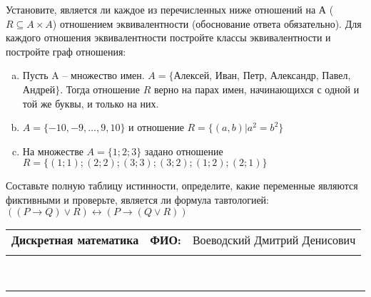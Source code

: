 \documentclass[10pt]{exam}
\newcommand{\class}{Дискретная математика}
\newcommand{\examdate}{}
\begin{document}
\begin{questions}
\question
Установите, является ли каждое из перечисленных ниже отношений на А ($R \subseteq A \times A$) отношением эквивалентности (обоснование ответа обязательно). Для каждого отношения эквивалентности постройте классы 
эквивалентности и постройте граф отношения:
\begin{enumerate} [a)]\setcounter{enumi}{0}
\item Пусть A – множество имен. $A = \{ $Алексей, Иван, Петр, Александр, Павел, Андрей$ \}$. Тогда отношение $R$ верно на парах имен, начинающихся с одной и той же буквы, и только на них.
\item $A = \{-10, -9, … , 9, 10\}$ и отношение $ R = \{(a,b)|a^{2} = b^{2}\}$
\item На множестве $A = \{1; 2; 3\}$ задано отношение $R = \{(1; 1); (2; 2); (3; 3); (3; 2); (1; 2); (2; 1)\}$
\end{enumerate}\question Составьте полную таблицу истинности, определите, какие переменные являются фиктивными и проверьте, является ли формула тавтологией:
$((P \rightarrow Q) \lor R) \leftrightarrow (P \rightarrow (Q \lor R))$

\end{questions}
\newpage
\begin{flushright}
\begin{tabular}{p{2.8in} r l}
\textbf{\class} & \textbf{ФИО:} &Воеводский Дмитрий Денисович
\\

\textbf{\examdate} &&\\
\end{tabular}\\
\end{flushright}
\rule[1ex]{\textwidth}{.1pt}
\end{document}
